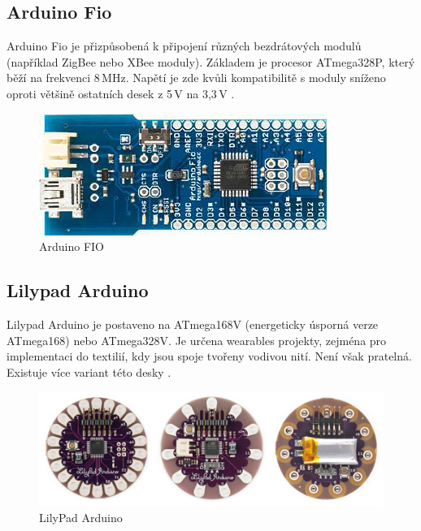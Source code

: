 	
	
		
		\subsection{Arduino Fio} 
		Arduino Fio je přizpůsobená k připojení různých bezdrátových modulů (například ZigBee nebo XBee moduly). Základem je procesor ATmega328P, který běží na frekvenci 8\,MHz. Napětí je zde kvůli kompatibilitě s moduly sníženo oproti většině ostatních desek z 5\,V na 3,3\,V \cite{ArduinoFio}.	
			\begin{figure}[!h]
  \begin{center}
    \includegraphics[scale=0.40]{obrazky/emded_arduino_fio}
  \end{center}
  \caption{Arduino FIO \cite{ArduinoFio}}
\end{figure}
	
		\subsection{Lilypad Arduino} 
		Lilypad Arduino je postaveno na ATmega168V (energeticky úsporná verze ATmega168) nebo ATmega328V. Je určena wearables projekty, zejména pro implementaci do textilií, kdy jsou spoje tvořeny vodivou nití. Není však pratelná. Existuje více variant této desky \cite{ArduinoLilipad}.	
			\begin{figure}[!h]
 \begin{center}
    \includegraphics[scale=0.5]{obrazky/emded_arduino_lilipad}
  \end{center}
  \caption{LilyPad Arduino \cite{ArduinoLilipad}}
\end{figure}
		
